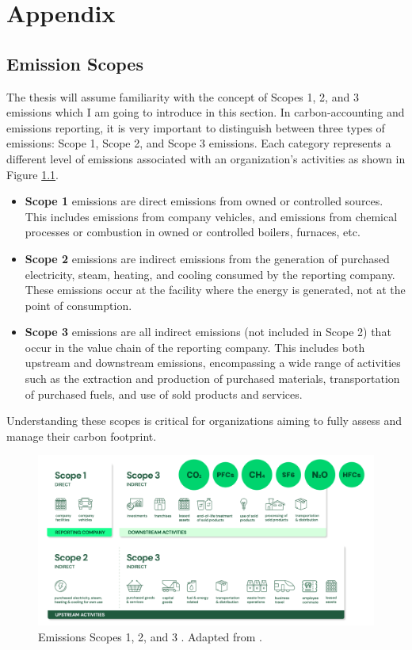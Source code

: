 \chapter{Appendix}
\label{AppendixA}

\section{Emission Scopes}
\label{sec:emission_scopes}
The thesis will assume familiarity with the concept of Scopes 1, 2, and 3 emissions which I am going to introduce in this section. In carbon-accounting and emissions reporting, it is very important to distinguish between three types of emissions: Scope 1, Scope 2, and Scope 3 emissions. Each category represents a different level of emissions associated with an organization's activities as shown in Figure \ref{fig:emission_scopes}.

\begin{itemize}
    \item \textbf{Scope 1} emissions are direct emissions from owned or controlled sources. This includes emissions from company vehicles, and emissions from chemical processes or combustion in owned or controlled boilers, furnaces, etc.
    \item \textbf{Scope 2} emissions are indirect emissions from the generation of purchased electricity, steam, heating, and cooling consumed by the reporting company. These emissions occur at the facility where the energy is generated, not at the point of consumption.
    \item \textbf{Scope 3} emissions are all indirect emissions (not included in Scope 2) that occur in the value chain of the reporting company. This includes both upstream and downstream emissions, encompassing a wide range of activities such as the extraction and production of purchased materials, transportation of purchased fuels, and use of sold products and services.
\end{itemize}

\noindent Understanding these scopes is critical for organizations aiming to fully assess and manage their carbon footprint.

\begin{figure}[h]
    \centering
    \includegraphics[width=1\textwidth]{figures/emission_scopes.png}
    \caption{Emissions Scopes 1, 2, and 3 . Adapted from \cite{Bernoville2022Scopes}.}
    \label{fig:emission_scopes}
\end{figure}


